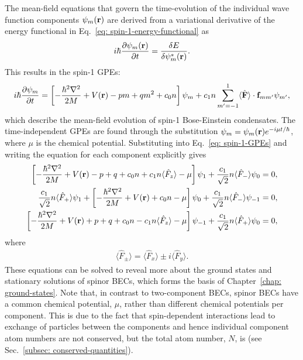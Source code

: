 The mean-field equations that govern the time-evolution of the individual
wave function components \(\psi_m(\vb{r})\) are derived from a variational
derivative of the energy functional in Eq.~\eqref{eq: spin-1-energy-functional}
as
\begin{align}\label{eq: energy-variational}
    i\hbar\pdv{\psi_m(\vb{r})}{t} = \fdv{E}{\psi_m^*(\vb{r})}.
\end{align}
This results in the spin-1 GPEs:
\begin{equation}\label{eq: spin-1-GPEs}
    i\hbar \pdv{\psi_m}{t} = \left[-\frac{\hbar^2\nabla^2}{2M} + V(\vb{r})
        - pm + qm^2 + c_0n\right]\psi_m
    + c_1n\sum_{m'=-1}^{1}\langle\hat{\vb{F}}\rangle\cdot \vb{f}_{mm'}\psi_{m'},
\end{equation}
which describe the mean-field evolution of spin-1 Bose-Einstein condensates.
The time-independent GPEs are found through the substitution
\(\psi_m = \psi_m(\vb{r})e^{-i\mu t/\hbar}\), where \(\mu \) is the chemical
potential.
Substituting into Eq.~\eqref{eq: spin-1-GPEs} and writing the equation for
each component explicitly gives
\begin{align}\label{eq: spin-1-GPEs-dimensional-psi1}
    \left[-\frac{\hbar^2\nabla^2}{2M} + V(\vb{r}) - p + q + c_0n + c_1n
    \langle\hat{F}_z\rangle - \mu\right]\psi_1
    + \frac{c_1}{\sqrt{2}}n\langle\hat{F}_-\rangle\psi_0    &= 0,  \\
    \frac{c_1}{\sqrt{2}}n\langle\hat{F}_+\rangle\psi_1
    + \left[-\frac{\hbar^2\nabla^2}{2M} + V(\vb{r}) + c_0n - \mu\right]\psi_0
    + \frac{c_1}{\sqrt{2}}n\langle\hat{F}_-\rangle\psi_{-1} &= 0,  \\
    \left[-\frac{\hbar^2\nabla^2}{2M} + V(\vb{r}) + p + q + c_0n
    - c_1n\langle\hat{F}_z\rangle - \mu\right]\psi_{-1}
    + \frac{c_1}{\sqrt{2}}n\langle\hat{F}_+\rangle\psi_0 &= 0,
    \label{eq: spin-1-GPEs-dimensional-psim1}
\end{align}
where
\begin{align}
    \langle\hat{F}_{\pm}\rangle = \langle\hat{F}_x\rangle
    \pm i\langle\hat{F}_y\rangle.
\end{align}
These equations can be solved to reveal more about the ground states and
stationary solutions of spinor BECs, which forms the basis of
Chapter~\ref{chap: ground-states}.
Note that, in contrast to two-component BECs, spinor BECs have a common chemical
potential, \(\mu\), rather than different chemical potentials per component.
This is due to the fact that spin-dependent interactions lead to exchange of
particles between the components and hence individual component atom numbers
are not conserved, but the total atom number, \(N\), is (see
Sec.~\ref{subsec: conserved-quantities}).

